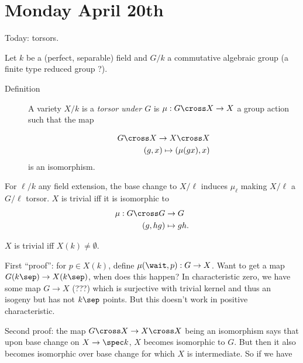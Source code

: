 \hypertarget{monday-april-20th}{%
\section{Monday April 20th}\label{monday-april-20th}}

Today: torsors.

Let \(k\) be a (perfect, separable) field and \(G/k\) a commutative
algebraic group (a finite type reduced group ?).

\begin{description}
\item[Definition]
A variety \(X/k\) is a \emph{torsor under \(G\)} is
\(\mu: G\cross X \to X\) a group action such that the map

\begin{align*}
G\cross X \to X \cross X \\
(g, x) \mapsto (\mu(gx), x)
\end{align*} is an isomorphism.
\end{description}

For \(\ell/k\) any field extension, the base change to \(X/\ell\)
induces \(\mu_\ell\) making \(X/\ell\) a \(G/\ell\) torsor. \(X\) is
trivial iff it is isomorphic to \begin{align*}
\mu: G\cross G &\to G \\
(g, hg) &\mapsto gh
.\end{align*}

\begin{description}
\tightlist
\item[Claim]
\(X\) is trivial iff \(X(k) \neq \emptyset\).
\end{description}

First ``proof'': for \(p\in X(k)\), define \(\mu(\wait, p): G \to X\).
Want to get a map \(G(k\sep) \to X(k\sep)\), when does this happen? In
characteristic zero, we have some map \(G\to X\) (???) which is
surjective with trivial kernel and thus an isogeny but has not \(k\sep\)
points. But this doesn't work in positive characteristic.

Second proof: the map \(G\cross X \to X \cross X\) being an isomorphism
says that upon base change on \(X \to \spec k\), \(X\) becomes
isomorphic to \(G\). But then it also becomes isomorphic over base
change for which \(X\) is intermediate. So if we have

\begin{center}\end{center}

